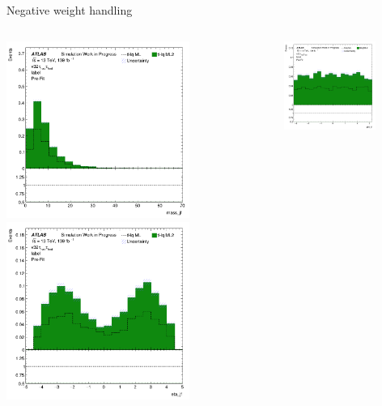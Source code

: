 \documentclass[10pt, UKenglish]{beamer}
\begin{document}
\begin{frame}{Negative weight handling}
  \begin{columns}
    \begin{column}{0.5\textwidth}
      \includegraphics[width=0.7\textwidth]{mass_jf}
      \includegraphics[width=0.7\textwidth]{eta_jf}
    \end{column}
    \begin{column}{0.5\textwidth}
      \includegraphics[width=0.7\textwidth]{phi_jf}

\end{column}
\end{columns}
\end{frame}
\end{document}
